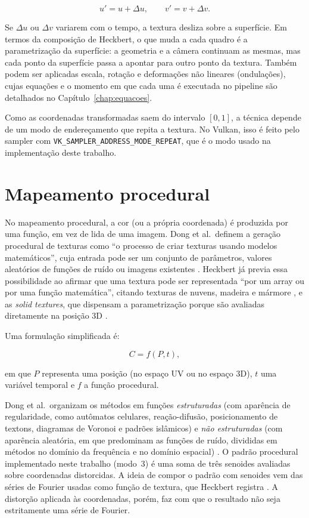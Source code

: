 \[
u'=u+\Delta u,\qquad v'=v+\Delta v.
\]

Se \(\Delta u\) ou \(\Delta v\) variarem com o tempo, a textura desliza sobre a superfície. Em termos da composição de Heckbert, o que muda a cada quadro é a parametrização da superfície: a geometria e a câmera continuam as mesmas, mas cada ponto da superfície passa a apontar para outro ponto da textura. Também podem ser aplicadas escala, rotação e deformações não lineares (ondulações), cujas equações e o momento em que cada uma é executada no pipeline são detalhados no Capítulo~\ref{chap:equacoes}.

Como as coordenadas transformadas saem do intervalo \([0,1]\), a técnica depende de um modo de endereçamento que repita a textura. No Vulkan, isso é feito pelo sampler com \texttt{VK\_SAMPLER\_ADDRESS\_MODE\_REPEAT}, que é o modo usado na implementação deste trabalho.

\section{Mapeamento procedural}

No mapeamento procedural, a cor (ou a própria coordenada) é produzida por uma função, em vez de lida de uma imagem. Dong et al.\ definem a geração procedural de texturas como ``o processo de criar texturas usando modelos matemáticos'', cuja entrada pode ser um conjunto de parâmetros, valores aleatórios de funções de ruído ou imagens existentes \cite[p.~1]{dong2020}. Heckbert já previa essa possibilidade ao afirmar que uma textura pode ser representada ``por um array ou por uma função matemática'', citando texturas de nuvens, madeira e mármore \cite[p.~1]{heckbert1986}, e as \textit{solid textures}, que dispensam a parametrização porque são avaliadas diretamente na posição 3D \cite[p.~3]{heckbert1986}.

Uma formulação simplificada é:

\[
C=f(P,t),
\]

em que \(P\) representa uma posição (no espaço UV ou no espaço 3D), \(t\) uma variável temporal e \(f\) a função procedural.

Dong et al.\ organizam os métodos em funções \textit{estruturadas} (com aparência de regularidade, como autômatos celulares, reação-difusão, posicionamento de textons, diagramas de Voronoi e padrões islâmicos) e \textit{não estruturadas} (com aparência aleatória, em que predominam as funções de ruído, divididas em métodos no domínio da frequência e no domínio espacial) \cite[pp.~3--4]{dong2020}. O padrão procedural implementado neste trabalho (modo~3) é uma soma de três senoides avaliadas sobre coordenadas distorcidas. A ideia de compor o padrão com senoides vem das séries de Fourier usadas como função de textura, que Heckbert registra \cite[p.~10]{heckbert1986}. A distorção aplicada às coordenadas, porém, faz com que o resultado não seja estritamente uma série de Fourier.

